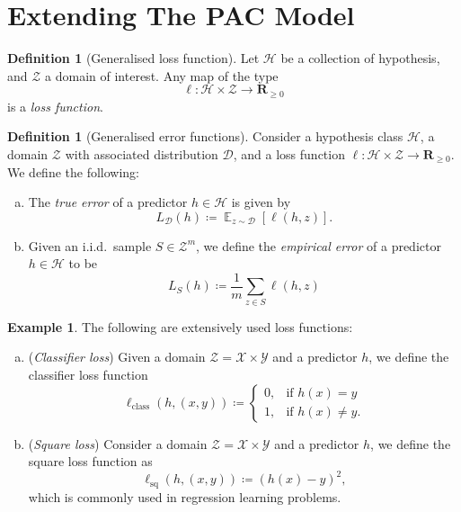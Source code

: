 \documentclass[11pt, reqno]{amsart}
\theoremstyle{definition}
\newtheorem{definition}[theorem]{Definition}
\newtheorem{example}[theorem]{Example}
\renewcommand{\geq}{\geqslant}
\newcommand{\R}{\mathbf{R}}
\DeclareMathOperator{\Expect}{\mathbb{E}} %
\begin{document}
\section{Extending The PAC Model}

\begin{definition}[Generalised loss function]
\label{def:generalised-loss-function}
Let \(\mathcal{H}\) be a collection of hypothesis, and \(\mathcal{Z}\) a domain
of interest. Any map of the type
\[
\ell: \mathcal{H} \times \mathcal{Z} \to \R_{\geq 0}
\]
is a \emph{loss function}.
\end{definition}

\begin{definition}[Generalised error functions]
\label{def:generalised-error-functions}
Consider a hypothesis class \(\mathcal{H}\), a domain \(\mathcal{Z}\) with
associated distribution \(\mathcal{D}\), and a loss function \(\ell: \mathcal{H}
\times \mathcal{Z} \to \R_{\geq 0}\). We define the following:
\begin{enumerate}[(a)]\setlength\itemsep{0em}
\item The \emph{true error} of a predictor \(h \in \mathcal{H}\) is given by
  \[
  L_{\mathcal{D}}(h) \coloneq \Expect_{z \sim \mathcal{D}}[\ell(h, z)].
  \]
\item Given an i.i.d.~sample \(S \in \mathcal{Z}^m\), we define the \emph{empirical
    error} of a predictor \(h \in \mathcal{H}\) to be
  \[
  L_S(h) \coloneq \frac{1}{m} \sum_{z \in S} \ell(h, z)
  \]
\end{enumerate}
\end{definition}

\begin{example}
\label{exp:loss-functions}
The following are extensively used loss functions:
\begin{enumerate}[(a)]\setlength\itemsep{0em}
\item (\emph{Classifier loss}) Given a domain \(\mathcal{Z} = \mathcal{X} \times
  \mathcal{Y}\) and a predictor \(h\), we define the classifier loss function
  \[
  \ell_{\text{class}}(h, (x, y)) \coloneq
  \begin{cases}
    0, &\text{if } h(x) = y \\
    1, &\text{if } h(x) \neq y.
  \end{cases}
  \]

\item (\emph{Square loss}) Consider a domain \(\mathcal{Z} = \mathcal{X} \times
  \mathcal{Y}\) and a predictor \(h\), we define the square loss function as
  \[
  \ell_{\text{sq}}(h, (x, y)) \coloneq (h(x) - y)^2,
  \]
  which is commonly used in regression learning problems.
\end{enumerate}
\end{example}
\end{document}
